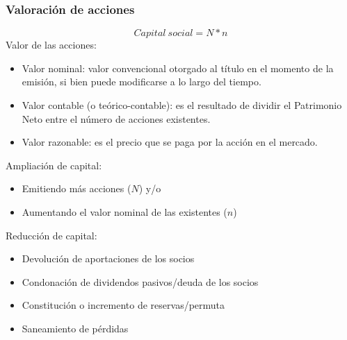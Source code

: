 \subsubsection{Valoración de acciones}
\[Capital\ social = N * n\]
Valor de las acciones:
\begin{itemize}
    \item Valor nominal: valor convencional otorgado al título en el momento de la emisión, si bien puede modificarse a lo largo del tiempo.
    \item Valor contable (o teórico-contable): es el resultado de dividir el Patrimonio Neto entre el número de acciones existentes.
    \item Valor razonable: es el precio que se paga por la acción en el mercado.
\end{itemize}

Ampliación de capital:
\begin{itemize}
    \item Emitiendo más acciones ($N$) y/o
    \item Aumentando el valor nominal de las existentes ($n$)
\end{itemize}

Reducción de capital:
\begin{itemize}
    \item Devolución de aportaciones de los socios
    \item Condonación de dividendos pasivos/deuda de los socios
    \item Constitución o incremento de reservas/permuta
    \item Saneamiento de pérdidas
\end{itemize}



